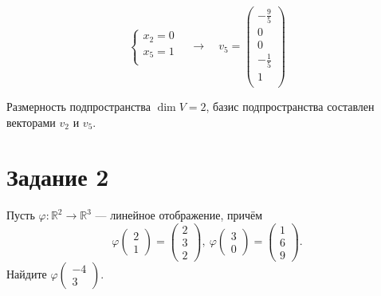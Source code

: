\documentclass[a4paper,12pt]{article}
\newcommand{\aanswer}{\par\vspace{5pt}\noindent{\bf Ответ. }}
\begin{document}
$$
\left\{
\begin{aligned}
x_2=0 \\
x_5 = 1 \\
\end{aligned} 
\right.
\quad \longrightarrow \quad
v_5 = 
\begin{pmatrix}
-\frac{9}{5} \\
0 \\
0 \\
- \frac{1}{5} \\
1 \\
\end{pmatrix}
$$
\aanswer
Размерность подпространства $\dim V = 2$, базис подпространства составлен векторами $v_2$ и $v_5$.


\section*{Задание 2}

Пусть $\varphi:\mathbb{R}^2\rightarrow \mathbb{R}^3$ --- линейное отображение, причём 
$$\varphi\begin{pmatrix}
{2}\\{1}
\end{pmatrix}=
\begin{pmatrix}
{2}\\{3}\\{2}
\end{pmatrix}, \
\varphi \begin{pmatrix}
{3}\\{0}
\end{pmatrix}=
\begin{pmatrix}
{1}\\{6}\\{9}
\end{pmatrix}.$$
Найдите $\varphi \begin{pmatrix}
-4 \\ 3
\end{pmatrix}$. \par
\vspace{8pt} 
\end{document}
